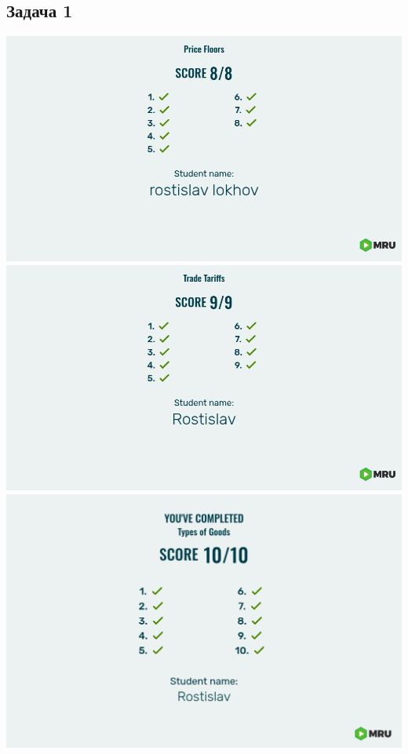 \documentclass[a4paper,12pt]{article}
\begin{document}
\subsection{Задача 1}
\includegraphics[scale=0.15]{graphs/3.2.jpg}
\includegraphics[scale=0.15]{graphs/3.3.jpg}
\includegraphics[scale=0.1]{graphs/3.4.jpg}
\end{document}
